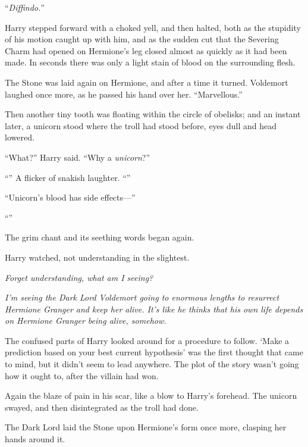 “\emph{Diffindo.}”

Harry stepped forward with a choked yell, and then halted, both as the stupidity of his motion caught up with him, and as the sudden cut that the Severing Charm had opened on Hermione’s leg closed almost as quickly as it had been made. In seconds there was only a light stain of blood on the surrounding flesh.

The Stone was laid again on Hermione, and after a time it turned. Voldemort laughed once more, as he passed his hand over her. “Marvellous.”

Then another tiny tooth was floating within the circle of obelisks; and an instant later, a unicorn stood where the troll had stood before, eyes dull and head lowered.

“What?” Harry said. “Why a \emph{unicorn}?”

“” A flicker of snakish laughter. “”

“Unicorn’s blood has side effects—”

“”

The grim chant and its seething words began again.

Harry watched, not understanding in the slightest.

\emph{Forget understanding, what am I seeing?}

\emph{I’m seeing the Dark Lord Voldemort going to enormous lengths to resurrect Hermione Granger and keep her alive. It’s like he thinks that his own life depends on Hermione Granger being alive, somehow.}

The confused parts of Harry looked around for a procedure to follow. ‘Make a prediction based on your best current hypothesis’ was the first thought that came to mind, but it didn’t seem to lead anywhere. The plot of the story wasn’t going how it ought to, after the villain had won.

Again the blaze of pain in his scar, like a blow to Harry’s forehead. The unicorn swayed, and then disintegrated as the troll had done.

The Dark Lord laid the Stone upon Hermione’s form once more, clasping her hands around it.

